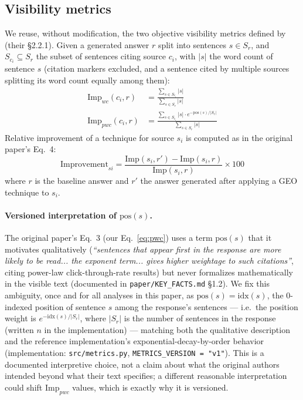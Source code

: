 \documentclass[11pt,a4paper]{article}
\newcommand{\Impwc}{\ensuremath{\mathrm{Imp}_{wc}}}
\newcommand{\Imppwc}{\ensuremath{\mathrm{Imp}_{pwc}}}
\begin{document}
\subsection{Visibility metrics}
\label{sec:metrics}

We reuse, without modification, the two objective visibility metrics
defined by \citet{aggarwal2024geo} (their \S2.2.1). Given a generated answer
$r$ split into sentences $s \in S_r$, and $S_{c_i} \subseteq S_r$ the subset
of sentences citing source $c_i$, with $|s|$ the word count of sentence $s$
(citation markers excluded, and a sentence cited by multiple sources
splitting its word count equally among them):
\begin{align}
  \Impwc(c_i, r) &= \frac{\sum_{s \in S_{c_i}} |s|}{\sum_{s \in S_r} |s|}
  \label{eq:wc}\\[4pt]
  \Imppwc(c_i, r) &= \frac{\sum_{s \in S_{c_i}} |s| \cdot e^{-\mathrm{pos}(s)/|S_r|}}{\sum_{s \in S_r} |s|}
  \label{eq:pwc}
\end{align}
Relative improvement of a technique for source $s_i$ is computed as in the
original paper's Eq.~4:
\begin{equation}
  \mathrm{Improvement}_{si} = \frac{\mathrm{Imp}(s_i, r') - \mathrm{Imp}(s_i, r)}{\mathrm{Imp}(s_i, r)} \times 100
  \label{eq:improvement}
\end{equation}
where $r$ is the baseline answer and $r'$ the answer generated after
applying a GEO technique to $s_i$.

\paragraph{Versioned interpretation of $\mathrm{pos}(s)$.} The original
paper's Eq.~3 (our Eq.~\ref{eq:pwc}) uses a term $\mathrm{pos}(s)$ that it
motivates qualitatively (\emph{``sentences that appear first in the response
are more likely to be read... the exponent term... gives higher weightage to
such citations''}, citing power-law click-through-rate results) but never
formalizes mathematically in the visible text (documented in
\texttt{paper/KEY\_FACTS.md} \S1.2). We fix this ambiguity, once and for
all analyses in this paper, as $\mathrm{pos}(s) = \mathrm{idx}(s)$, the
0-indexed position of sentence $s$ among the response's sentences ---
i.e.\ the position weight is $e^{-\mathrm{idx}(s)/|S_r|}$, where $|S_r|$ is
the number of sentences in the response (written $n$ in the implementation)
--- matching both the qualitative description and
the reference implementation's exponential-decay-by-order behavior
(implementation: \texttt{src/metrics.py}, \texttt{METRICS\_VERSION = "v1"}).
This is a documented interpretive choice, not a claim about what the
original authors intended beyond what their text specifies; a different
reasonable interpretation could shift $\Imppwc$ values, which is exactly why
it is versioned.
\end{document}
